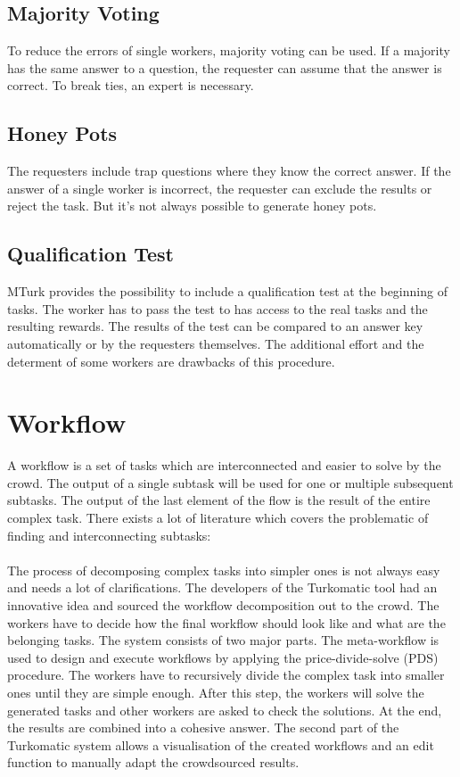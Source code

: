 \subsection{Majority Voting}
To reduce the errors of single workers, majority voting can be used. If a majority has the same answer to a question, the requester can assume that the answer is correct. To break ties, an expert is necessary. 
\subsection{Honey Pots}
\label{sub:honeypots}
The requesters include trap questions where they know the correct answer. If the answer of a single worker is incorrect, the requester can exclude the results or reject the task. But it's not always possible to generate honey pots. 
\subsection{Qualification Test}
MTurk provides the possibility to include a qualification test at the beginning of tasks. The worker has to pass the test to has access to the real tasks and the resulting rewards. The results of the test can be compared to an answer key automatically or by the requesters themselves. The additional effort and the determent of some workers are drawbacks of this procedure.

\section{Workflow}
A workflow is a set of tasks which are interconnected and easier to solve by the crowd. The output of a single subtask will be used for one or multiple subsequent subtasks. The output of the last element of the flow is the result of the entire complex task. There exists a lot of literature which covers the problematic of finding and interconnecting subtasks:\\\\
The process of decomposing complex tasks into simpler ones is not always easy and needs a lot of clarifications. The developers of the Turkomatic\cite{turkomatic} tool had an innovative idea and sourced the workflow decomposition out to the crowd. The workers have to decide how the final workflow should look like and what are the belonging tasks. The system consists of two major parts. The meta-workflow is used to design and execute workflows by applying the price-divide-solve (PDS) procedure. The workers have to recursively divide the complex task into smaller ones until they are simple enough. After this step, the workers will solve the generated tasks and other workers are asked to check the solutions. At the end, the results are combined into a cohesive answer. The second part of the Turkomatic system allows a visualisation of the created workflows and an edit function to manually adapt the crowdsourced results.

